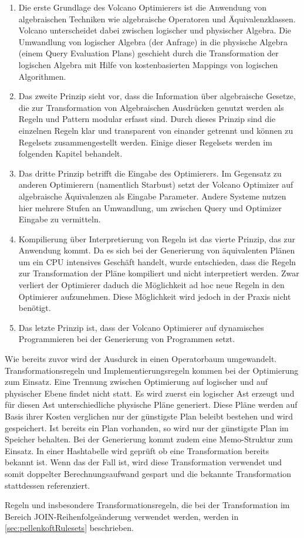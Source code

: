 \begin{enumerate}

\item Die erste Grundlage des Volcano Optimierers ist die Anwendung von algebraischen Techniken wie algebraische Operatoren und Äquivalenzklassen. Volcano unterscheidet dabei zwischen logischer und physischer Algebra. Die Umwandlung von logischer Algebra (der Anfrage) in die physische Algebra (einem Query Evaluation Plans) geschieht durch die Transformation der logischen Algebra mit Hilfe von kostenbasierten Mappings von logischen Algorithmen. 


\item Das zweite Prinzip sieht vor, dass die Information über algebraische Gesetze, die zur Transformation von Algebraischen Ausdrücken genutzt werden als Regeln und Pattern modular erfasst sind. Durch dieses Prinzip sind die einzelnen Regeln klar und transparent von einander getrennt und können zu Regelsets zusammengestellt werden. Einige dieser Regelsets werden im folgenden Kapitel behandelt.


\item Das dritte Prinzip betrifft die Eingabe des Optimierers. Im Gegensatz zu anderen Optimierern (namentlich Starbust) setzt der Volcano Optimizer auf algebraische Äquivalenzen als Eingabe Parameter. Andere Systeme nutzen hier mehrere Stufen an Umwandlung, um zwischen Query und Optimizer Eingabe zu vermitteln. 

\item Kompilierung über Interpretierung von Regeln ist das vierte Prinzip, das zur Anwendung kommt. Da es sich bei der Generierung von äquivalenten Plänen um ein CPU intensives Geschäft handelt, wurde entschieden, dass die Regeln zur Transformation der Pläne kompiliert und nicht interpretiert werden. Zwar verliert der Optimierer daduch die Möglichkeit ad hoc neue Regeln in den Optimierer aufzunehmen. Diese Möglichkeit wird jedoch in der Praxis nicht benötigt.

\item Das letzte Prinzip ist, dass der Volcano Optimierer auf dynamisches Programmieren bei der Generierung von Programmen setzt. 
\end{enumerate}


Wie bereits zuvor wird der Ausdurck in einen Operatorbaum umgewandelt. Transformationsregeln und Implementierungsregeln kommen bei der Optimierung zum Einsatz. Eine Trennung zwischen Optimierung auf logischer und auf physischer Ebene findet nicht statt. Es wird zuerst ein logischer Ast erzeugt und für diesen Ast unterschiedliche physische Pläne generiert. Diese Pläne werden auf Basis ihrer Kosten verglichen nur der günstigste Plan beleibt bestehen und wird gespeichert. Ist bereits ein Plan vorhanden, so wird nur der günstigste Plan im Speicher behalten. Bei der Generierung kommt zudem eine Memo-Struktur zum Einsatz. In einer Hashtabelle wird geprüft ob eine Transformation bereits bekannt ist. Wenn das der Fall ist, wird diese Transformation verwendet und somit doppelter Berechnungsaufwand gespart und die bekannte Transformation stattdessen referenziert.

Regeln und insbesondere Transformationsregeln, die bei der Transformation im Bereich JOIN-Reihenfolgeänderung verwendet werden, werden in \ref{sec:pellenkoftRulesets} beschrieben.

